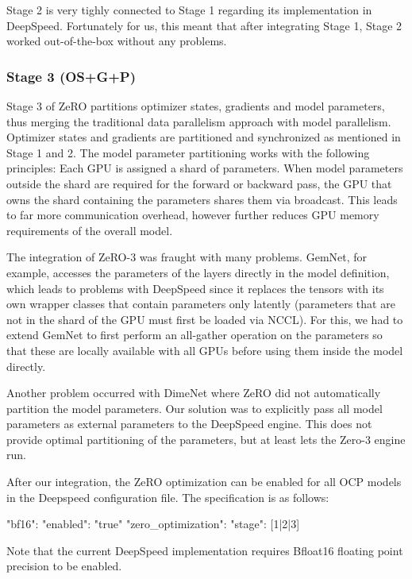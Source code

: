 Stage 2 is very tighly connected to Stage 1 regarding its implementation in DeepSpeed. Fortunately 
for us, this meant that after integrating Stage 1, Stage 2 worked out-of-the-box without any problems.

\subsubsection{Stage 3 (OS+G+P)}

Stage 3 of ZeRO partitions optimizer states, gradients and model parameters, thus merging the 
traditional data parallelism approach with model parallelism. Optimizer states and gradients 
are partitioned and synchronized as mentioned in Stage 1 and 2. The model parameter partitioning 
works with the following principles: Each GPU is assigned a shard of parameters. When model 
parameters outside the shard are required for the forward or backward pass, the GPU that owns 
the shard containing the parameters shares them via broadcast. This leads to far more communication 
overhead, however further reduces GPU memory requirements of the overall model.

The integration of ZeRO-3 was fraught with many problems. GemNet, for example, accesses the 
parameters of the layers directly in the model definition, which leads to problems with 
DeepSpeed since it replaces the tensors with its own wrapper classes that contain parameters 
only latently (parameters that are not in the shard of the GPU must first be loaded via NCCL). 
For this, we had to extend GemNet to first perform an all-gather operation on the parameters 
so that these are locally available with all GPUs before using them inside the model directly.

Another problem occurred with DimeNet where ZeRO did not automatically partition the model 
parameters. Our solution was to explicitly pass all model parameters as external parameters 
to the DeepSpeed engine. This does not provide optimal partitioning of the parameters, but 
at least lets the Zero-3 engine run.

After our integration, the ZeRO optimization can be enabled for all OCP models in the Deepspeed configuration 
file. The specification is as follows:

\begin{json}
"bf16": {
    "enabled": "true"
}
"zero_optimization": {
    "stage": [1|2|3]
}
\end{json}

Note that the current DeepSpeed implementation requires Bfloat16 floating point precision to be enabled. 
